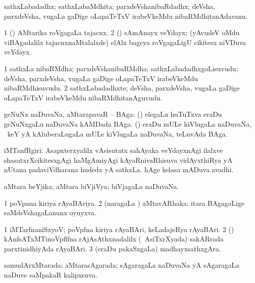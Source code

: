 \bentry
{}
\gl{\nA}
\bmng
sathxLabadadhx; sathxLabaMdhita; parxdeVshanibaRdadhx; deVsha, parxdeVsha, \mo vugaLa gaDige oLapaTeTxV irabeVkeMdu nibaRMdhitanAdavanu. 
\emng
\eentry

\bentry
{}
\gl{\nA}
\bmng
\bnum
\num{1} (\veYshA) AMtarika roVgagaLa tajacnx. 
\num{2} (\ame) sAmAnayx veYdayx; (yAvudeV oMdu viBAgadalilx tajacnxnaMtalalxde) elAlx bageya roVgagaLigU cikitesx niVDuva veYdayx. 
\enum
\emng
\eentry

\bentry
{}
\gl{\nA}
\bmng
\bnum
\num{1} sathxLa nibaRMdha; parxdeVshanibaRMdha; sathxLabadadhxgoLisuvudu; deVsha, parxdeVsha, \mo vugaLa gaDige oLapaTeTxV irabeVkeMdu nibaRMdhisuvudu. 
\num{2} sathxLabadadhxte; deVsha, parxdeVsha, \mo vugaLa gaDige oLapaTeTxV irabeVkeMdu nibaRMdhitanAguvudu. 
\enum
\emng
\eentry

\bentry
{}
\gl{\nA}
\bmng
geNuNx naDuvaNa, aMtarapavaR -- BAga: 
\banum
{} (\savi) elegaLu huTuTxva eraDu geNuNxgaLu naDuvaNa kAMDada BAga. 
 (\aMrashA) eraDu mULe kiVlugaLa naDuvaNa, \kanmu\ keY yA kAluberaLugaLa mULe kiVlugaLa naDuvaNa, teLuvAda BAga. 
\eanum
\emng
\eentry

\bentry
{}
\gl{\nA}
\bmng
iMTanfRgiri: 
\banum
{} Asapxterxyalilx vAsisutatx sahAyaka veYdayxnAgi ilalxve shasatxrXcikitesxgAgi haMgAmiyAgi kAyaRnivaRhisuva vidAyxthiRya yA nUtana padaviVdharana hudedx yA sathxLa. 
 hAge kelasa mADuva avadhi. 
\eanum
\emng
\eentry

\bentry
{}
\gl{\gu}
\bmng
aMtara beYjika; aMtara biVjiVya; biVjagaLa naDuvaNa. 
\emng
\eentry

\bentry
{}
\gl{\gu}
\bmng
\bnum
\num{1} poVpana kiriya rAyaBAriya. 
\num{2} (naragaLa \vi) aMtavARhaka; itara BAgagaLige saMdeVshagaLanunx oyuyxva. 
\enum
\emng
\eentry

\bentry
{}
\gl{\nA}
\bmng
\bnum
\num{1} iMTarfnaniSxyoV; poVpfna kiriya rAyaBAri, keLadajeRya rAyaBAri. 
\num{2} (\ca) kAnfsATxMTinoVpflfna rAjAsAthxnadalilx (\kanmu\ AsiTxrXyada) sakARrada parxtinidhiyAda rAyaBAri. 
\num{3} (eraDu pakaSxgaLa) madhayxsathxgAra. 
\enum
\emng
\eentry

\bentry
{}
\gl{\gu}
\bmng
samudArxMtarada; aMtarasAgarada; sAgaragaLa naDuvaNa yA sAgaragaLa naDuve saMpakaR kalipxsuva. 
\emng
\eentry

